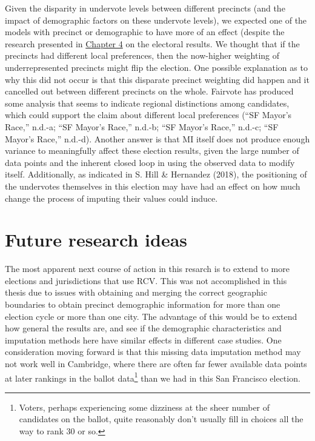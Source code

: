 \documentclass[12pt,twoside]{reedthesis}
\begin{document}
Given the disparity in undervote levels between different precincts (and the impact of demographic factors on these undervote levels), we expected one of the models with precinct or demographic to have more of an effect (despite the research presented in \protect\hyperlink{missing-litreview}{Chapter 4} on the electoral results. We thought that if the precincts had different local preferences, then the now-higher weighting of underrepresented precincts might flip the election. One possible explanation as to why this did not occur is that this disparate precinct weighting did happen and it cancelled out between different precincts on the whole. Fairvote has produced some analysis that seems to indicate regional distinctions among candidates, which could support the claim about different local preferences (``SF Mayor's Race,'' n.d.-a; ``SF Mayor's Race,'' n.d.-b; ``SF Mayor's Race,'' n.d.-c; ``SF Mayor's Race,'' n.d.-d). Another answer is that MI itself does not produce enough variance to meaningfully affect these election results, given the large number of data points and the inherent closed loop in using the observed data to modify itself. Additionally, as indicated in S. Hill \& Hernandez (2018), the positioning of the undervotes themselves in this election may have had an effect on how much change the process of imputing their values could induce.

\hypertarget{further-research}{%
\section{Future research ideas}\label{further-research}}

The most apparent next course of action in this resarch is to extend to more elections and jurisdictions that use RCV. This was not accomplished in this thesis due to issues with obtaining and merging the correct geographic boundaries to obtain precinct demographic information for more than one election cycle or more than one city. The advantage of this would be to extend how general the results are, and see if the demographic characteristics and imputation methods here have similar effects in different case studies. One consideration moving forward is that this missing data imputation method may not work well in Cambridge, where there are often far fewer available data points at later rankings in the ballot data\footnote{Voters, perhaps experiencing some dizziness at the sheer number of candidates on the ballot, quite reasonably don't usually fill in choices all the way to rank 30 or so.} than we had in this San Francisco election.
\end{document}
